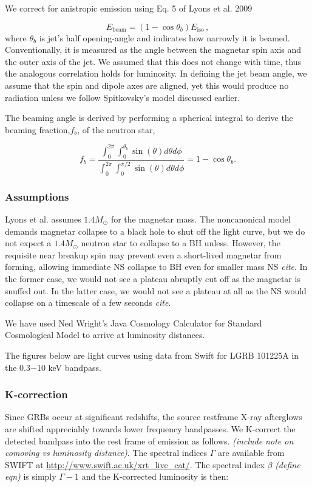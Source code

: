 \documentclass{article}
\begin{document}
We correct for anistropic emission using Eq. 5 of Lyons et al. 2009 \cite{Lyons:2009ka}

\begin{equation}
 E_{\mathrm{beam}}= (1-\cos{\theta_b}) E_{\mathrm{iso}}\,,
 \end{equation}
 where $\theta_b$ is jet's half opening-angle and indicates how narrowly it is beamed. Conventionally, it is measured as the angle between the magnetar spin axis and the outer axis of the jet. We assumed that this does not change with time, thus the analogous correlation holds for luminosity. In defining the jet beam angle, we assume that the spin and dipole axes are aligned, yet this would produce no radiation unless we follow Spitkovsky's model discussed earlier. 

The beaming angle is derived by performing a spherical integral to derive the beaming fraction,$f_b$, of the neutron star,

\begin{equation}
f_b=\frac{\int_0^{2\pi} \int_0^{\theta_b} \sin(\theta) d\theta d\phi}{\int_0^{2\pi} \int_0^{\pi/2} \sin(\theta) d\theta d\phi} = 1-\cos{\theta_b}.
\end{equation}

\subsubsection{Assumptions}

Lyons et al. assumes $1.4 M_{\odot}$ for the magnetar mass. The noncanonical model demands magnetar collapse to a black hole to shut off the light curve, but we do not expect a $1.4 M_{\odot}$  neutron star to collapse to a BH unless. However, the requisite near breakup spin may prevent even a short-lived magnetar from forming, allowing immediate NS collapse to BH even for smaller mass NS \textit{cite}. In the former case, we would not see a plateau abruptly cut off as the magnetar is snuffed out. In the latter case, we would not see a plateau at all as the NS would collapse on a timescale of a few seconds \textit{cite}.
\hspace{2cm}

We have used Ned Wright's Java Cosmology Calculator for Standard Cosmological Model to arrive at luminosity distances.

The figures below are light curves using data from Swift for LGRB 101225A in the 0.3$-$10 keV bandpass.


\subsubsection{K-correction}
Since GRBs occur at significant redshifts, the source restframe X-ray afterglows are shifted appreciably towards lower frequency bandpasses.  We K-correct the detected bandpass into the rest frame of emission  as follows. \textit{(include note on comoving vs luminosity distance)}. The spectral indices $\Gamma$ are available from SWIFT at \url{http://www.swift.ac.uk/xrt_live_cat/}. The spectral index $\beta$ \textit{(define eqn)} is simply $\Gamma -1$ and the K-corrected luminosity is then:
\end{document}
